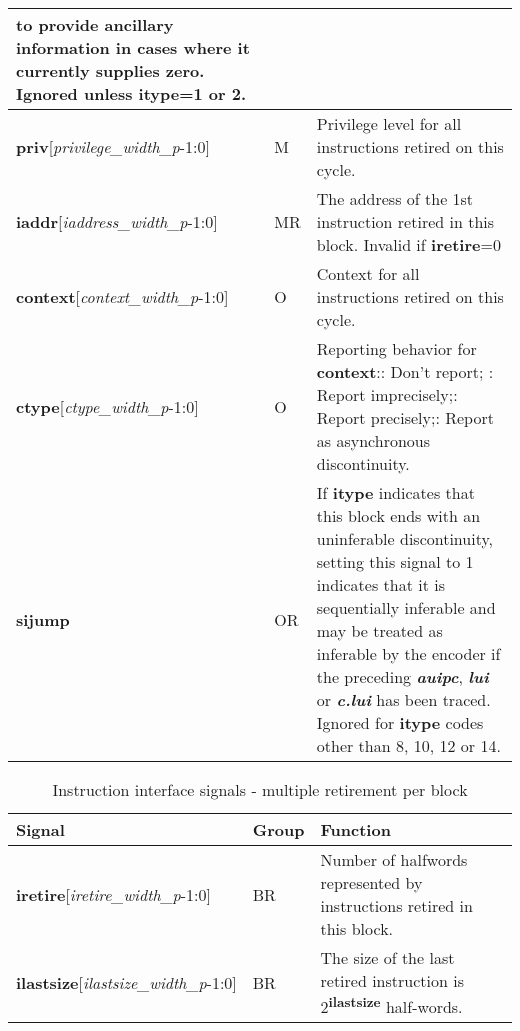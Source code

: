\begin{table}[htp]
\begin{tabulary}{\textwidth}{|l|l|p{80mm}|}
        to provide ancillary information in cases where it currently supplies zero.
        Ignored unless \textbf{itype}=1 or 2.\\
        \hline
        \textbf{priv}[\textit{privilege\_width\_p}-1:0] & M & Privilege level for all instructions retired on this cycle.\\
        \hline
        \textbf{iaddr}[\textit{iaddress\_width\_p}-1:0] & MR & The address of the 1st instruction retired in this block.
        Invalid if \textbf{iretire}=0 \\
        \hline
        \textbf{context}[\textit{context\_width\_p}-1:0] & O & Context for all instructions retired on this cycle.\\
        \hline
        \textbf{ctype}[\textit{ctype\_width\_p}-1:0] & O & Reporting behavior for \textbf{context}:: Don't report; : Report imprecisely;: Report precisely;: Report as asynchronous discontinuity.\\
        \hline
        \textbf{sijump} & OR & If \textbf{itype} indicates that this block ends with an uninferable discontinuity, setting this signal to 1 
        indicates that it is sequentially inferable and may be treated as inferable by the encoder if the preceding 
        \textbf{\textit{auipc}}, \textbf{\textit{lui}} or \textbf{\textit{c.lui}} has been traced.  
        Ignored for \textbf{itype} codes other than 8, 10, 12 or 14.\\
        \hline
    \end{tabulary}
\end{table}

\begin{table}[htp]
    \centering
    \caption{Instruction interface signals - multiple retirement per block}
    \label{tab:multi-ingress}
    \begin{tabulary}{\textwidth}{|l|l|p{80mm}|}
        \hline
        \textbf{Signal} & \textbf{Group} & \textbf{Function} \\
        \hline
        \textbf{iretire}[\textit{iretire\_width\_p}-1:0] & BR & Number of halfwords represented by instructions retired in this block.\\
        \hline
        \textbf{ilastsize}[\textit{ilastsize\_width\_p}-1:0] & BR & The size of the last retired instruction is 2\textsuperscript{\textbf{ilastsize}} half-words.\\
        \hline
    \end{tabulary}
\end{table}

